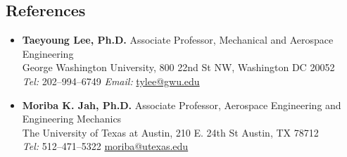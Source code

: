 \subsection*{References}
{}

\begin{itemize}
    \item[] \textbf{Taeyoung Lee, Ph.D.}
Associate Professor, Mechanical and Aerospace Engineering\\
George Washington University, 800 22nd St NW, Washington DC 20052 \\
\textit{Tel:} 202--994--6749 \hspace{1cm} \textit{Email:} \href{mailto:tylee@gwu.edu}{tylee@gwu.edu}

\item[]\textbf{Moriba K. Jah, Ph.D.}
Associate Professor, Aerospace Engineering and Engineering Mechanics \\
The University of Texas at Austin, 210 E. 24th St Austin, TX 78712 \\
\textit{Tel:} 512--471--5322 \hspace{1cm}  \href{mailto:moriba@utexas.edu}{moriba@utexas.edu}
\end{itemize}

